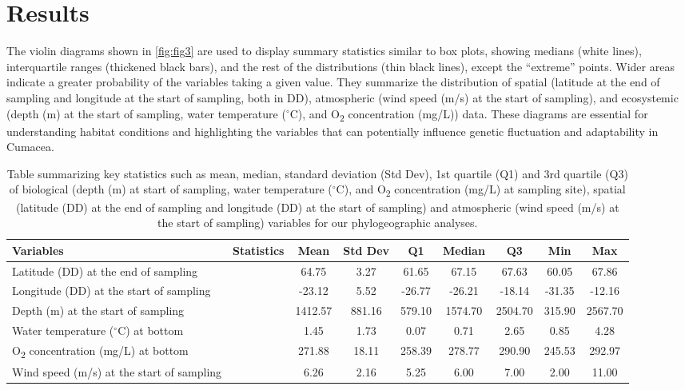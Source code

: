 \section{Results}\label{results}
The violin diagrams shown in \autoref{fig:fig3} are used to display summary statistics similar to box plots, showing medians (white lines), interquartile ranges (thickened black bars), and the rest of the distributions (thin black lines), except the ``extreme'' points. Wider areas indicate a greater probability of the variables taking a given value. They summarize the distribution of spatial (latitude at the end of sampling and longitude at the start of sampling, both in DD), atmospheric (wind speed (m/s) at the start of sampling), and ecosystemic (depth (m) at the start of sampling, water temperature ($^\circ$C), and O\textsubscript{2} concentration (mg/L)) data. These diagrams are essential for understanding habitat conditions and highlighting the variables that can potentially influence genetic fluctuation and adaptability in Cumacea. 

\begin{table}[ht]
\centering
\renewcommand{\arraystretch}{1.2}
\begin{tabular}{|l|l|c|c|c|c|c|c|c|}
\hline
\textbf{Variables} & \textbf{Statistics} & \textbf{Mean} & \textbf{Std Dev} & \textbf{Q1} & \textbf{Median} & \textbf{Q3} & \textbf{Min} & \textbf{Max} \\ \hline
Latitude (DD) at the end of sampling & & 64.75 & 3.27 & 61.65 & 67.15 & 67.63 & 60.05 & 67.86 \\ 
Longitude (DD) at the start of sampling & & -23.12 & 5.52 & -26.77 & -26.21 & -18.14 & -31.35 & -12.16 \\ 
Depth (m) at the start of sampling & & 1412.57 & 881.16 & 579.10 & 1574.70 & 2504.70 & 315.90 & 2567.70 \\ 
Water temperature ($^\circ$C) at bottom & & 1.45 & 1.73 & 0.07 & 0.71 & 2.65 & 0.85 & 4.28 \\ 
O\textsubscript{2} concentration (mg/L) at bottom & & 271.88 & 18.11 & 258.39 & 278.77 & 290.90 & 245.53 & 292.97 \\ 
Wind speed (m/s) at the start of sampling & & 6.26 & 2.16 & 5.25 & 6.00 & 7.00 & 2.00 & 11.00 \\ \hline
\end{tabular}
\caption{Table summarizing key statistics such as mean, median, standard deviation (Std Dev), 1st quartile (Q1) and 3rd quartile (Q3) of biological (depth (m) at start of sampling, water temperature ($^\circ$C), and O\textsubscript{2} concentration (mg/L) at sampling site), spatial (latitude (DD) at the end of sampling and longitude (DD) at the start of sampling) and atmospheric (wind speed (m/s) at the start of sampling) variables for our phylogeographic analyses. \label{fig:tab1}}
\end{table}

